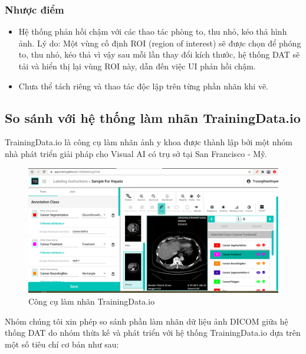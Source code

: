 \subsubsection{Nhược điểm}
\begin{itemize}
    \item Hệ thống phản hồi chậm với các thao tác phòng to, thu nhỏ, kéo thả hình ảnh. Lý do: Một vùng cố định ROI (region of interest) sẽ được chọn để phóng to, thu nhỏ, kéo thả vì vậy sau mỗi lần thay đổi kích thước, hệ thống DAT sẽ tải và hiển thị lại vùng ROI này, dẫn đến việc UI phản hồi chậm. 
    \item Chưa thể tách riêng và thao tác độc lập trên  từng phần nhãn khi vẽ. 
\end{itemize}

\subsection{So sánh với hệ thống làm nhãn TrainingData.io}
TrainingData.io là công cụ làm nhãn ảnh y khoa được thành lập bởi một nhóm nhà phát triển giải pháp cho Visual AI có trụ sở tại San Francisco - Mỹ. \\

\begin{figure}[H]
    \centering
    \includegraphics[width=\textwidth]{images/chapter-07-images/user-training-data-io.png}
    \caption{Công cụ làm nhãn TrainingData.io}
\end{figure}

\indent Nhóm chúng tôi xin phép so sánh phần làm nhãn dữ liệu ảnh DICOM giữa hệ thống DAT do nhóm thừa kế và phát triển với hệ thống TrainingData.io dựa trên một số tiêu chí cơ bản như sau: 

